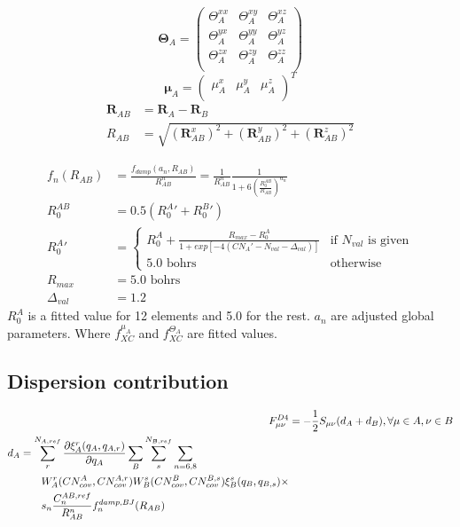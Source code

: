 \begin{equation}
    \pmb{\Theta}_A = 
    \begin{pmatrix}
        \Theta_A^{xx} & \Theta_A^{xy} & \Theta_A^{xz}\\
        \Theta_A^{yx} & \Theta_A^{yy} & \Theta_A^{yz}\\
        \Theta_A^{zx} & \Theta_A^{zy} & \Theta_A^{zz}\\
    \end{pmatrix}
\end{equation}
\begin{equation}
    \pmb{\mu}_A = 
    \begin{pmatrix}
        \mu_A^{x}&
        \mu_A^{y}&
        \mu_A^{z}\\
    \end{pmatrix}^T
\end{equation}
\begin{align}
    \pmb{R}_{AB} &= \pmb{R}_A-\pmb{R}_B\\
    R_{AB} &= \sqrt{(\pmb{R}^x_{AB})^2+(\pmb{R}^y_{AB})^2+(\pmb{R}^z_{AB})^2}
\end{align}


\begin{align}
    f_n(R_{AB}) &= \frac{f_{damp}(a_n,R_{AB})}{R_{AB}^n}=\frac{1}{R_{AB}^n}\frac{1}{1+6\left(\frac{R_0^{AB}}{R_{AB}}\right)^{a_n}}\\
    R_0^{AB} &= 0.5 ({R^A_0}'+ {R^B_0}')\\
    {R^A_0}' &= \begin{cases}R^A_0 + \frac{R_{max}-R^A_0}{1+exp[-4(CN_A'-N_{val}-\Delta_{val})]} & \text{if }N_{val}\text{ is given}\\5.0 \text{ bohrs} & \text{otherwise}\end{cases}\\
        R_{max} &= 5.0 \text{ bohrs}\\
    \Delta_{val} &= 1.2
\end{align}
$R_0^A$ is a fitted value for 12 elements and 5.0 for the rest. $a_n$ are adjusted global parameters. 
Where $f^{\mu_A}_{XC}$ and $f^{\Theta_A}_{XC}$ are fitted values. 
\subsection{Dispersion contribution}
\begin{align}
    F^{D4}_{\mu\nu} &= -\frac{1}{2}S_{\mu\nu}(d_A+d_B), \forall \mu \in A, \nu \in B\\
\begin{split}
    d_A &= \sum_r^{N_{A,ref}} \frac{\partial \xi^r_A(q_A,q_{A,r})}{\partial q_A}\sum_B\sum_s^{N_{B,ref}}\sum_{n=6,8}\\
    &\quad\quad W_A^r(CN^A_{cov},CN^{A,r}_{cov})W_B^s(CN^B_{cov},CN^{B,s}_{cov})\xi^s_B(q_B,q_{B,s})\times\\
    &\quad\quad s_n\frac{C^{AB,ref}_n}{R_{AB}^n}f_n^{damp,BJ}(R_{AB}) 
\end{split}
\end{align}

